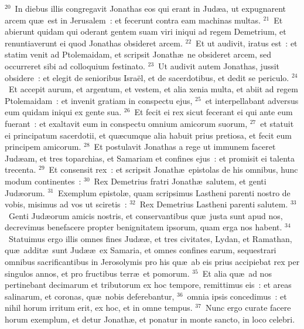 ${}^{20}$~In diebus illis congregavit Jonathas eos qui erant in Jud\ae a, ut expugnarent arcem qu\ae\ est in Jerusalem~: et fecerunt contra eam machinas multas.
${}^{21}$~Et abierunt quidam qui oderant gentem suam viri iniqui ad regem Demetrium, et renuntiaverunt ei quod Jonathas obsideret arcem.
${}^{22}$~Et ut audivit, iratus est~: et statim venit ad Ptolemaidam, et scripsit Jonath\ae\ ne obsideret arcem, sed occurreret sibi ad colloquium festinato.
${}^{23}$~Ut audivit autem Jonathas, jussit obsidere~: et elegit de senioribus Isra\"el, et de sacerdotibus, et dedit se periculo.
${}^{24}$~Et accepit aurum, et argentum, et vestem, et alia xenia multa, et abiit ad regem Ptolemaidam~: et invenit gratiam in conspectu ejus,
${}^{25}$~et interpellabant adversus eum quidam iniqui ex gente sua.
${}^{26}$~Et fecit ei rex sicut fecerant ei qui ante eum fuerant~: et exaltavit eum in conspectu omnium amicorum suorum,
${}^{27}$~et statuit ei principatum sacerdotii, et qu\ae cumque alia habuit prius pretiosa, et fecit eum principem amicorum.
${}^{28}$~Et postulavit Jonathas a rege ut immunem faceret Jud\ae am, et tres toparchias, et Samariam et confines ejus~: et promisit ei talenta trecenta.
${}^{29}$~Et consensit rex~: et scripsit Jonath\ae\ epistolas de his omnibus, hunc modum continentes~:
${}^{30}$~Rex Demetrius fratri Jonath\ae\ salutem, et genti Jud\ae orum.
${}^{31}$~Exemplum epistol\ae , quam scripsimus Lastheni parenti nostro de vobis, misimus ad vos ut sciretis~:
${}^{32}$~Rex Demetrius Lastheni parenti salutem.
${}^{33}$~Genti Jud\ae orum amicis nostris, et conservantibus qu\ae\ justa sunt apud nos, decrevimus benefacere propter benignitatem ipsorum, quam erga nos habent.
${}^{34}$~Statuimus ergo illis omnes fines Jud\ae \ae , et tres civitates, Lydan, et Ramathan, qu\ae\ addit\ae\ sunt Jud\ae \ae\ ex Samaria, et omnes confines earum, sequestrari omnibus sacrificantibus in Jerosolymis pro his qu\ae\ ab eis prius accipiebat rex per singulos annos, et pro fructibus terr\ae\ et pomorum.
${}^{35}$~Et alia qu\ae\ ad nos pertinebant decimarum et tributorum ex hoc tempore, remittimus eis~: et areas salinarum, et coronas, qu\ae\ nobis deferebantur,
${}^{36}$~omnia ipsis concedimus~: et nihil horum irritum erit, ex hoc, et in omne tempus.
${}^{37}$~Nunc ergo curate facere horum exemplum, et detur Jonath\ae , et ponatur in monte sancto, in loco celebri.


